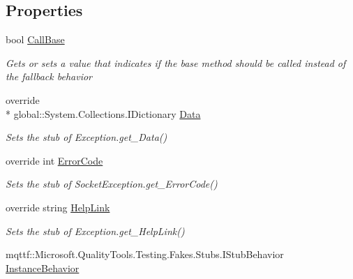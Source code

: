 \subsection*{Properties}
\begin{DoxyCompactItemize}
\item 
bool \hyperlink{class_system_1_1_net_1_1_sockets_1_1_fakes_1_1_stub_socket_exception_a7552ff7e557f6426af0e23c08d0dc548}{Call\-Base}
\begin{DoxyCompactList}\small\item\em Gets or sets a value that indicates if the base method should be called instead of the fallback behavior\end{DoxyCompactList}\item 
override \\*
global\-::\-System.\-Collections.\-I\-Dictionary \hyperlink{class_system_1_1_net_1_1_sockets_1_1_fakes_1_1_stub_socket_exception_a93dddd08e3ad3549a95901604375459b}{Data}
\begin{DoxyCompactList}\small\item\em Sets the stub of Exception.\-get\-\_\-\-Data()\end{DoxyCompactList}\item 
override int \hyperlink{class_system_1_1_net_1_1_sockets_1_1_fakes_1_1_stub_socket_exception_a6da803d5869f2b471afdc473dca6f2c7}{Error\-Code}
\begin{DoxyCompactList}\small\item\em Sets the stub of Socket\-Exception.\-get\-\_\-\-Error\-Code()\end{DoxyCompactList}\item 
override string \hyperlink{class_system_1_1_net_1_1_sockets_1_1_fakes_1_1_stub_socket_exception_a723e5d25fe4f54c2d116152cd85edb24}{Help\-Link}
\begin{DoxyCompactList}\small\item\em Sets the stub of Exception.\-get\-\_\-\-Help\-Link()\end{DoxyCompactList}\item 
mqttf\-::\-Microsoft.\-Quality\-Tools.\-Testing.\-Fakes.\-Stubs.\-I\-Stub\-Behavior \hyperlink{class_system_1_1_net_1_1_sockets_1_1_fakes_1_1_stub_socket_exception_a3a8a6615e6b4300e7bab2b65a2646e43}{Instance\-Behavior}

\end{DoxyCompactItemize}
